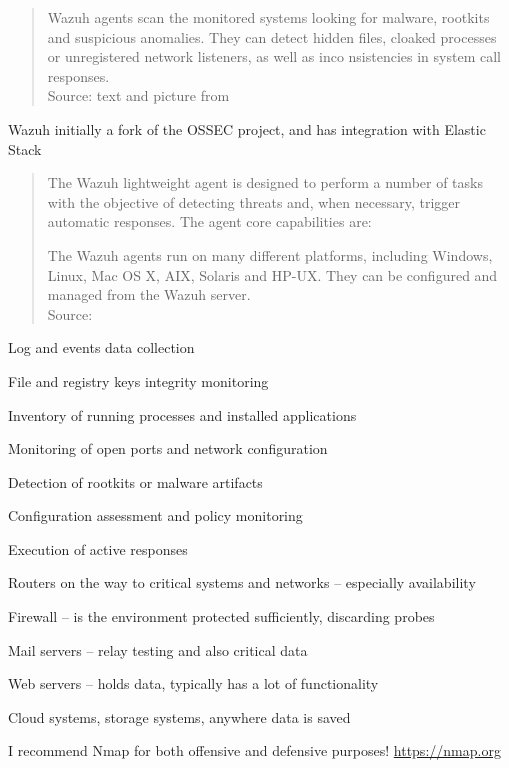 \documentclass[Screen16to9,17pt]{foils}
\begin{document}
\begin{quote}\small
Wazuh agents scan the monitored systems looking for malware, rootkits and suspicious anomalies. They can detect hidden files, cloaked processes or unregistered network listeners, as well as inco
nsistencies in system call responses.\\
Source: text and picture from 
\end{quote}

\begin{list2}
\item Wazuh initially a fork of the OSSEC project, and has integration with Elastic Stack
\end{list2}



\begin{quote}\small
The Wazuh lightweight agent is designed to perform a number of tasks with the objective of detecting threats and, when necessary, trigger automatic responses. The agent core capabilities are:

The Wazuh agents run on many different platforms, including Windows, Linux, Mac OS X, AIX, Solaris and HP-UX. They can be configured and managed from the Wazuh server.\\
Source: 
\end{quote}

\begin{list2}
\item Log and events data collection
\item File and registry keys integrity monitoring
\item Inventory of running processes and installed applications
\item Monitoring of open ports and network configuration
\item Detection of rootkits or malware artifacts
\item Configuration assessment and policy monitoring
\item Execution of active responses
\end{list2}



\begin{list2}
\item Routers on the way to critical systems and networks -- especially availability
\item Firewall -- is the environment protected sufficiently, discarding probes
\item Mail servers -- relay testing and also critical data
\item Web servers -- holds data, typically has a lot of functionality
\item Cloud systems, storage systems, anywhere data is saved
\item I recommend Nmap for both offensive and defensive purposes! \url{https://nmap.org}
\end{list2}
\end{document}
